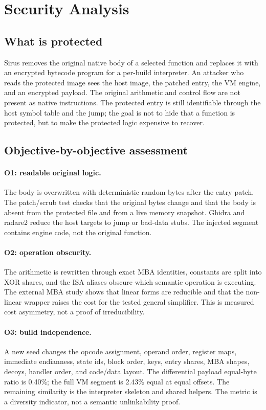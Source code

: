 \section{Security Analysis}
\label{sec:security}

\subsection{What is protected}

Sirus removes the original native body of a selected function and replaces it
with an encrypted bytecode program for a per-build interpreter. An attacker who
reads the protected image sees the host image, the patched entry, the VM engine,
and an encrypted payload. The original arithmetic and control flow are not
present as native instructions. The protected entry is still identifiable through
the host symbol table and the  jump; the goal is not to hide that a
function is protected, but to make the protected logic expensive to recover.

\subsection{Objective-by-objective assessment}

\paragraph{O1: readable original logic.}
The body is overwritten with deterministic random bytes after the entry patch.
The patch/scrub test checks that the original bytes change and that the body is
absent from the protected file and from a live memory snapshot. Ghidra and
radare2 reduce the host targets to jump or bad-data stubs. The injected segment
contains engine code, not the original function.

\paragraph{O2: operation obscurity.}
The arithmetic is rewritten through exact MBA identities, constants are split
into XOR shares, and the ISA aliases obscure which semantic operation is
executing. The external MBA study shows that linear forms are reducible and that
the non-linear wrapper raises the cost for the tested general simplifier. This is
measured cost asymmetry, not a proof of irreducibility.

\paragraph{O3: build independence.}
A new seed changes the opcode assignment, operand order, register maps, immediate
endianness, state ids, block order, keys, entry shares, MBA shapes, decoys,
handler order, and code/data layout. The differential payload equal-byte ratio is
0.40\%; the full VM segment is 2.43\% equal at equal offsets. The remaining
similarity is the interpreter skeleton and shared helpers. The metric is a
diversity indicator, not a semantic unlinkability proof.

